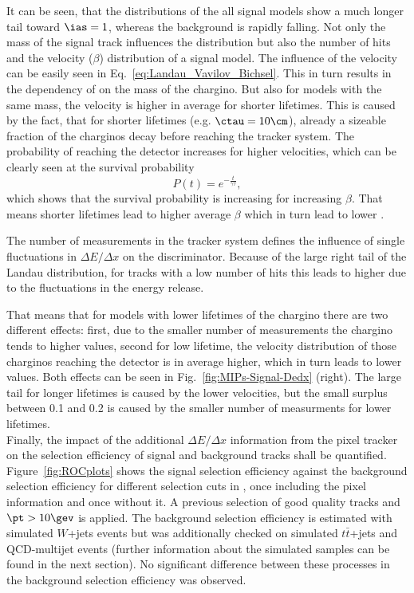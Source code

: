 It can be seen, that the \ias distributions of the all signal models show a much longer tail toward $\ias=1$, whereas the background is rapidly falling.
Not only the mass of the signal track influences the \ias distribution but also the number of hits and the velocity ($\beta$) distribution of a signal model.
The influence of the velocity can be easily seen in Eq.~\ref{eq:Landau_Vavilov_Bichsel}. 
This in turn results in the dependency of \ias on the mass of the chargino.
But also for models with the same mass, the velocity is higher in average for shorter lifetimes.
This is caused by the fact, that for shorter lifetimes (e.g. $\ctau=10\cm$), already a sizeable fraction of the charginos decay before reaching the tracker system.
The probability of reaching the detector increases for higher velocities, which can be clearly seen at the survival probability
\begin{equation}
P \left( t \right) = e^{-\frac{t}{\gamma \tau}},
\end{equation} 
which shows that the survival probability is increasing for increasing $\beta$. 
That means shorter lifetimes lead to higher average $\beta$ which in turn lead to lower \ias.

The number of measurements in the tracker system defines the influence of single fluctuations in $\Delta E/\Delta x$ on the \ias discriminator. 
Because of the large right tail of the Landau distribution, for tracks with a low number of hits this leads to higher \ias due to the  fluctuations in the energy release.

That means that for models with lower lifetimes of the chargino there are two different effects: 
first, due to the smaller number of measurements the chargino tends to higher \ias values, 
second for low lifetime, the velocity distribution of those charginos reaching the detector is in average higher, which in turn leads to lower  \ias values.
Both effects can be seen in Fig.~\ref{fig:MIPs-Signal-Dedx} (right).
The large tail for longer lifetimes is caused by the lower velocities, but the small surplus between 0.1 and 0.2 is caused by the smaller number of measurments for lower lifetimes.\\


Finally, the impact of the additional $\Delta E/\Delta x$ information from the pixel tracker on the selection efficiency of signal and background tracks shall be quantified.
Figure~\ref{fig:ROCplots} shows the signal selection efficiency against the background selection efficiency for different selection cuts in \ias, once including the pixel information and once without it.
A previous selection of good quality tracks and $\pt>10\gev$ is applied.
The background selection efficiency is estimated with simulated $W$+jets  events but was additionally checked on simulated $t\bar{t}$+jets  and QCD-multijet events 
(further information about the simulated samples can be found in the next section).
No significant difference between these processes in the background selection efficiency was observed.


